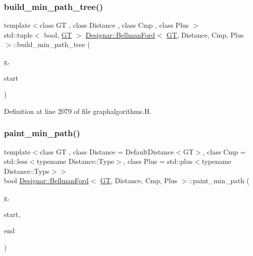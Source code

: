 \subsubsection{\texorpdfstring{build\+\_\+min\+\_\+path\+\_\+tree()}{build\_min\_path\_tree()}}
{\footnotesize\ttfamily template$<$class GT , class Distance , class Cmp , class Plus $>$ \\
std\+::tuple$<$ bool, \hyperlink{demo-buildgraph_8_c_a3001c40d2c31ca87ed96cd7d1334a55e}{GT} $>$ \hyperlink{class_designar_1_1_bellman_ford}{Designar\+::\+Bellman\+Ford}$<$ \hyperlink{demo-buildgraph_8_c_a3001c40d2c31ca87ed96cd7d1334a55e}{GT}, Distance, Cmp, Plus $>$\+::build\+\_\+min\+\_\+path\+\_\+tree (\begin{DoxyParamCaption}\item[{\hyperlink{demo-buildgraph_8_c_a3001c40d2c31ca87ed96cd7d1334a55e}{GT} \&}]{g,  }\item[{Node \&}]{start }\end{DoxyParamCaption})}



Definition at line 2079 of file graphalgorithms.\+H.

\mbox{\label{class_designar_1_1_bellman_ford_aa3bbfc0acd202d4af5e10f7405e8a25c}} 
\subsubsection{\texorpdfstring{paint\+\_\+min\+\_\+path()}{paint\_min\_path()}}
{\footnotesize\ttfamily template$<$class GT , class Distance  = Default\+Distance$<$\+G\+T$>$, class Cmp  = std\+::less$<$typename Distance\+::\+Type$>$, class Plus  = std\+::plus$<$typename Distance\+::\+Type$>$$>$ \\
bool \hyperlink{class_designar_1_1_bellman_ford}{Designar\+::\+Bellman\+Ford}$<$ \hyperlink{demo-buildgraph_8_c_a3001c40d2c31ca87ed96cd7d1334a55e}{GT}, Distance, Cmp, Plus $>$\+::paint\+\_\+min\+\_\+path (\begin{DoxyParamCaption}\item[{\hyperlink{demo-buildgraph_8_c_a3001c40d2c31ca87ed96cd7d1334a55e}{GT} \&}]{g,  }\item[{Node \&}]{start,  }\item[{Node \&}]{end }\end{DoxyParamCaption})\hspace{0.3cm}{\ttfamily [inline]}}



